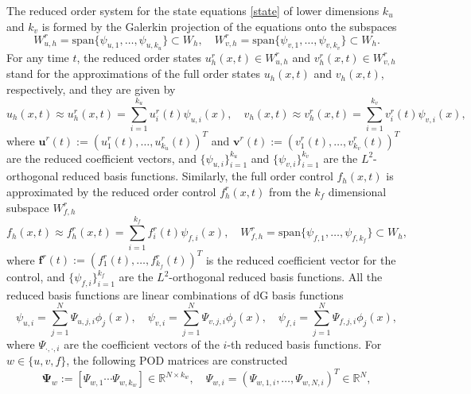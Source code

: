 \documentclass[preprint,12pt]{elsarticle}
\begin{document}
The reduced order system for the state equations \eqref{state} of lower dimensions $k_u$ and $k_v$ is formed by the Galerkin projection of the equations onto  the subspaces
\begin{equation*}
W_{u,h}^{r}=\text{span} \{ \psi_{u,1}, \ldots, \psi_{u,k_u} \}\subset W_h, \quad W_{v,h}^{r}=\text{span} \{ \psi_{v,1}, \ldots, \psi_{v,k_v}\}\subset W_h.
\end{equation*}
For any time $t$, the reduced order states $u_{h}^r(x,t)\in W_{u,h}^{r}$ and $v_{h}^r(x,t)\in W_{v,h}^{r}$ stand for the approximations of the full order states $u_{h}(x,t)$ and $v_{h}(x,t)$, respectively, and they are given by
\begin{equation*}
u_h(x,t)\approx u_{h}^r(x,t) = \sum_{i=1}^{k_u} u_i^r(t) \psi_{u,i}(x), \quad v_h(x,t)\approx v_h^r(x,t)=\sum_{i=1}^{k_v} v_i^r(t) \psi_{v,i}(x),
\end{equation*}
where $\bm{u}^r(t):= ( u^r_1(t),\ldots, u^r_{k_u}(t) )^T$ and $\bm{v}^r(t):= ( v^r_1(t),\ldots, v^r_{k_v}(t) )^T$ are the reduced coefficient vectors, and $\{\psi_{u,i} \}_{i=1}^{k_u}$ and $\{\psi_{v,i} \}_{i=1}^{k_v}$ are the $L^2$-orthogonal reduced basis functions. Similarly, the full order control $f_{h}(x,t)$ is approximated by the reduced  order control $f_{h}^r(x,t)$ from the $k_f$ dimensional subspace $W_{f,h}^{r}$
\begin{equation*}
f_h(x,t)\approx f_{h}^r(x,t) = \sum_{i=1}^{k_f} f_i^r(t) \psi_{f,i}(x), \quad W_{f,h}^{r}=\text{span} \{ \psi_{f,1}, \ldots, \psi_{f,k_f} \}\subset W_h,
\end{equation*}
where $\bm{f}^r(t):= ( f^r_1(t),\ldots, f^r_{k_f}(t) )^T$ is the reduced coefficient vector for the control, and $\{\psi_{f,i} \}_{i=1}^{k_f}$ are the $L^2$-orthogonal reduced basis functions. All the reduced basis functions are linear combinations of dG basis functions
\begin{equation*}
\psi_{u,i} = \sum_{j=1}^{N} \Psi_{u,j,i} \phi_j(x), \quad \psi_{v,i} = \sum_{j=1}^{N} \Psi_{v,j,i} \phi_j(x), \quad \psi_{f,i} = \sum_{j=1}^{N} \Psi_{f,j,i} \phi_j(x),
\end{equation*}
where $\Psi_{\cdot,\cdot,i}$ are the coefficient vectors of the $i$-th reduced basis functions. For $w\in\{u,v,f\}$,
the following POD matrices are constructed
\begin{equation*}
\bm{\Psi}_w := [ \Psi_{w,1} \cdots \Psi_{w,k_w}] \in\mathbb{R}^{N\times k_w}, \quad \Psi_{w,i} = \left( \Psi_{w,1,i}, \ldots ,\Psi_{w,N,i} \right)^T \in\mathbb{R}^N,
\end{equation*}
\end{document}
